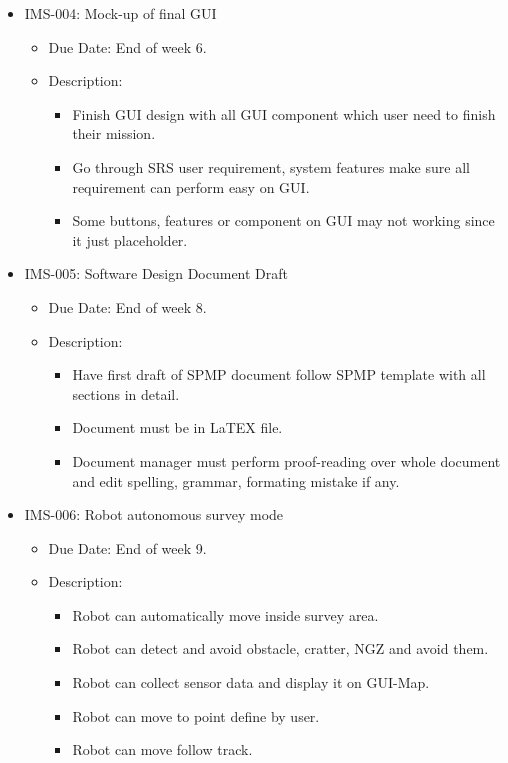 \documentclass[11pt, a4paper]{article}
\begin{document}
\begin{itemize}
\begin{itemize}
				\end{itemize}
				\item IMS-004: Mock-up of final GUI
				\begin{itemize}
					\item Due Date: End of week 6.
					\item Description:
					\begin{itemize}
						\item Finish GUI design with all GUI component which user need to finish their mission.
						\item Go through SRS user requirement, system features make sure all requirement can perform easy on GUI.
						\item Some buttons, features or component on GUI may not working since it just placeholder. 
					\end{itemize}
				\end{itemize}
				\item IMS-005: Software Design Document Draft
				\begin{itemize}
					\item Due Date: End of week 8.
					\item Description:
					\begin{itemize}
						\item Have first draft of SPMP document follow SPMP template with all sections in detail.
						\item Document must be in LaTEX file.
						\item Document manager must perform proof-reading over whole document and edit spelling, grammar, formating mistake if any.
					\end{itemize}
				\end{itemize}
				\item IMS-006: Robot autonomous survey mode
				\begin{itemize}
					\item Due Date: End of week 9.
					\item Description:
					\begin{itemize}
						\item Robot can automatically move inside survey area.
						\item Robot can detect and avoid obstacle, cratter, NGZ and avoid them.
						\item Robot can collect sensor data and display it on GUI-Map.
						\item Robot can move to point define by user.
						\item Robot can move follow track.

\end{itemize}
\end{itemize}
\end{itemize}
\end{document}
